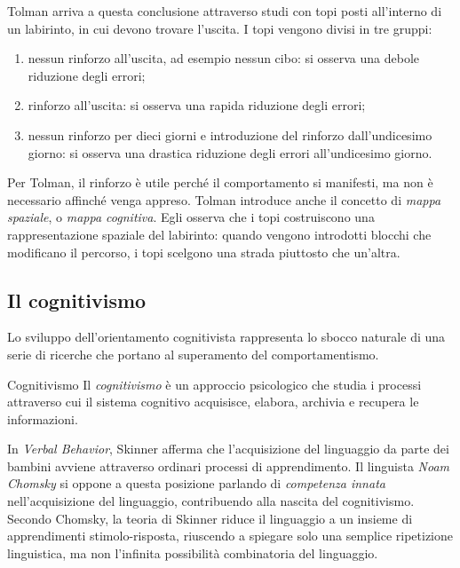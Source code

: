 \documentclass[a4paper]{article}
\begin{document}
Tolman arriva a questa conclusione attraverso studi con topi posti all'interno di un labirinto, in cui devono trovare l'uscita. I topi vengono divisi in tre gruppi:
\begin{enumerate}
    \item nessun rinforzo all'uscita, ad esempio nessun cibo: si osserva una debole riduzione degli errori;
    \item rinforzo all'uscita: si osserva una rapida riduzione degli errori;
    \item nessun rinforzo per dieci giorni e introduzione del rinforzo dall'undicesimo giorno: si osserva una drastica riduzione degli errori all'undicesimo giorno.
\end{enumerate}
Per Tolman, il rinforzo è utile perché il comportamento si manifesti, ma non è necessario affinché venga appreso.
Tolman introduce anche il concetto di \emph{mappa spaziale}, o \emph{mappa cognitiva}. Egli osserva che i topi costruiscono una rappresentazione spaziale del labirinto: quando vengono introdotti blocchi che modificano il percorso, i topi scelgono una strada piuttosto che un'altra.
\subsection{Il cognitivismo}
Lo sviluppo dell'orientamento cognitivista rappresenta lo sbocco naturale di una serie di ricerche che portano al superamento del comportamentismo.
\begin{snippetdefinition}{Cognitivismo}
    Il \emph{cognitivismo} è un approccio psicologico che studia i processi attraverso cui il sistema cognitivo acquisisce, elabora, archivia e recupera le informazioni.
\end{snippetdefinition}
In \emph{Verbal Behavior}, Skinner afferma che l'acquisizione del linguaggio da parte dei bambini avviene attraverso ordinari processi di apprendimento. Il linguista \emph{Noam Chomsky} si oppone a questa posizione parlando di \emph{competenza innata} nell'acquisizione del linguaggio, contribuendo alla nascita del cognitivismo.
Secondo Chomsky, la teoria di Skinner riduce il linguaggio a un insieme di apprendimenti stimolo-risposta, riuscendo a spiegare solo una semplice ripetizione linguistica, ma non l'infinita possibilità combinatoria del linguaggio.
\end{document}
